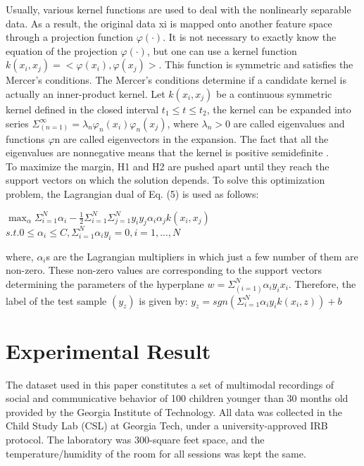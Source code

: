 Usually, various kernel functions are used to deal with the nonlinearly separable data. 
As a result, the original data xi is mapped onto another feature space through a 
projection function ${\varphi(\cdot)}$. It is not necessary to exactly know the equation of the 
projection ${\varphi(\cdot)}$, but one can use a kernel function ${k(x_i,x_j)=<\varphi(x_i),\varphi(x_j)>}$. 
This function is symmetric and satisfies the Mercer’s conditions. The Mercer’s conditions determine 
if a candidate kernel is actually an inner-product kernel. Let ${k(x_i,x_j)}$ be a continuous 
symmetric kernel defined in the closed interval ${t_1\leq t\leq t_2}$, the kernel can be expanded 
into series ${\Sigma_(n=1)^\infty = \lambda_n\varphi_n(x_i)\varphi_n(x_j)}$, where 
${\lambda_n > 0}$ are called eigenvalues and functions $\varphi$n are called eigenvectors in the expansion. 
The fact that all the eigenvalues are nonnegative means that the kernel is positive 
semidefinite \cite{SupportVector1995}. \\

To maximize the margin, H1 and H2 are pushed apart until they reach the support vectors 
on which the solution depends. To solve this optimization problem, the Lagrangian dual 
of Eq. (5) is used as follows:

$\max_\alpha \Sigma_{i=1}^{N} \alpha_i - \frac{1}{2} \Sigma_{i=1}^{N} \Sigma_{j=1}^{N} y_i y_j \alpha_i \alpha_j k(x_i, x_j)$\newline
$s.t. 0 \le \alpha_i \le C, \Sigma_{i=1}^{N} \alpha_i y_i = 0, i = 1, ..., N$\newline

where, ${\alpha_i}$s are the Lagrangian multipliers in which just a few number of them are 
non-zero. These non-zero values are corresponding to the support vectors determining 
the parameters of the hyperplane ${w = \Sigma_(i=1)^N\alpha_iy_ix_i }$. Therefore, the label 
of the test sample ${(y_z)}$ is given by:
$y_z = sgn(\Sigma_{i=1}^{N} \alpha_i y_i k(x_i, z)) + b$\newline


\section{Experimental Result}
The dataset used in this paper constitutes a set of multimodal recordings of social and 
communicative behavior of 100 children younger than 30 months old provided by the Georgia 
Institute of Technology. All data was collected in the Child Study Lab (CSL) at Georgia Tech, 
under a university-approved IRB protocol. The laboratory was 300-square feet space, and the 
temperature/humidity of the room for all sessions was kept the same.\\

